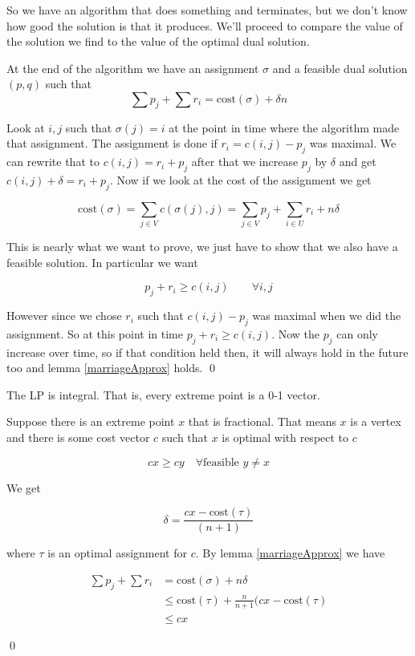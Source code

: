 So we have an algorithm that does something and terminates, but we don't know how good the solution is that it produces. We'll proceed to compare the value of the solution we find to the value of the optimal dual solution.

\begin{lem}\label{marriageApprox} At the end of the algorithm we have an assignment $\sigma$ and a feasible dual solution $(p,q)$ such that
\[\sum p_j + \sum r_i = \text{cost}(\sigma) + \delta n\]
\end{lem}
\begin{pr}
Look at $i,j$ such that $\sigma(j)=i$ at the point in time where the algorithm made that assignment. The assignment is done if $r_i=c(i,j)-p_j$ was maximal. We can rewrite that to $c(i,j) = r_i+p_j$ after that we increase $p_j$ by $\delta$ and get $c(i,j) +\delta = r_i+p_j$. Now if we look at the cost of the assignment we get

\[\text{cost}(\sigma) = \sum_{j\in V} c(\sigma(j),j) = \sum_{j\in V} p_j + \sum_{i\in U} r_i + n\delta\]

This is nearly what we want to prove, we just have to show that we also have a feasible solution. In particular we want

\[p_j+r_i \geq c(i,j) \qquad \forall i,j\]

However since we chose $r_i$ such that $c(i,j)-p_j$ was maximal when we did the assignment. So at this point in time $p_j + r_i \geq c(i,j)$. Now the $p_j$ can only increase over time, so if that condition held then, it will always hold in the future too and lemma \ref{marriageApprox} holds.
\qed \end{pr}

\begin{cor} The LP is integral. That is, every extreme point is a 0-1 vector.\end{cor}

\begin{pr} Suppose there is an extreme point $x$ that is fractional. That means $x$ is a vertex and there is some cost vector $c$ such that $x$ is optimal with respect to $c$

\[cx \geq cy \quad \forall \text{feasible } y\neq x\]

We get

\[\delta = \frac{cx - \text{cost}(\tau)}{(n+1)}\]

where $\tau$ is an optimal assignment for $c$. By lemma \ref{marriageApprox} we have

\begin{align*}
\sum p_j + \sum r_i &= \text{cost}(\sigma) + n\delta \\
 &\leq \text{cost}(\tau) + \frac{n}{n+1} (cx-\text{cost}(\tau)\\
 &\leq cx
\end{align*}

\qed \end{pr}

